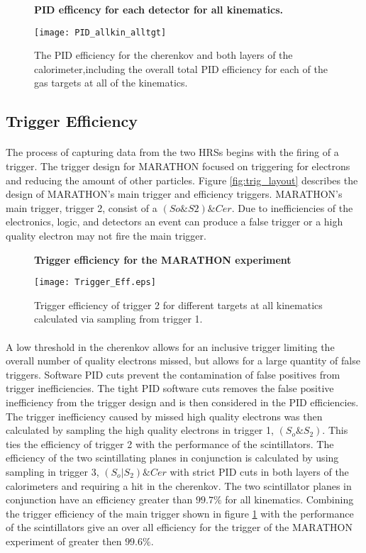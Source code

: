\begin{figure}
	{\centering
		\textbf{PID efficency for each detector for all kinematics. }\par\medskip}
	\centering
	\texttt{[image: PID\_allkin\_alltgt]}
	\caption{The PID efficiency for the cherenkov and both layers of the calorimeter,including the overall total PID efficiency for each of the gas targets at all of the kinematics.}
\end{figure}

\subsection[]{Trigger Efficiency}
\paragraph{} The process of capturing data from the two HRSs begins with the firing of a trigger. The trigger design for MARATHON focused on triggering for electrons and reducing the amount of other particles. Figure \ref{fig:trig_layout} describes the design of MARATHON's main trigger and efficiency triggers. MARATHON's main trigger, trigger 2, consist of a $(So \& S2) \& Cer$. Due to inefficiencies of the electronics, logic, and detectors an event can produce a false trigger or a high quality electron may not fire 
the main trigger.

\begin{figure}[]
	\centering
	\textbf{Trigger efficiency for the MARATHON experiment }\par\medskip
	\texttt{[image: Trigger\_Eff.eps]}
	\caption{Trigger efficiency of trigger 2 for different targets at all kinematics calculated via sampling from trigger 1. }
	\label{trigeff}
\end{figure}

\paragraph{} A low threshold in the cherenkov allows for an inclusive trigger limiting the overall number of quality electrons missed, but allows for a large quantity of false triggers. Software PID cuts prevent the contamination of false positives from trigger inefficiencies. The tight PID software cuts removes the false positive inefficiency from the trigger design and is then considered in the PID efficiencies. The trigger inefficiency caused by missed high quality electrons was then calculated by sampling the high quality electrons in trigger 1, $(S_o \& S_2)$. This ties the efficiency of trigger 2 with the performance of the scintillators. The efficiency of the two scintillating planes in conjunction is calculated by using sampling in trigger 3, $(S_o | S_2) \& Cer$ with strict PID cuts in both layers of the calorimeters and requiring a hit in the cherenkov. The two scintillator planes in conjunction have an efficiency greater than $99.7 \% $ for all kinematics. Combining the trigger efficiency of the main trigger shown in figure \ref{trigeff} with the performance of the scintillators give an over all efficiency for the trigger of the MARATHON experiment of greater then $99.6\%$.

